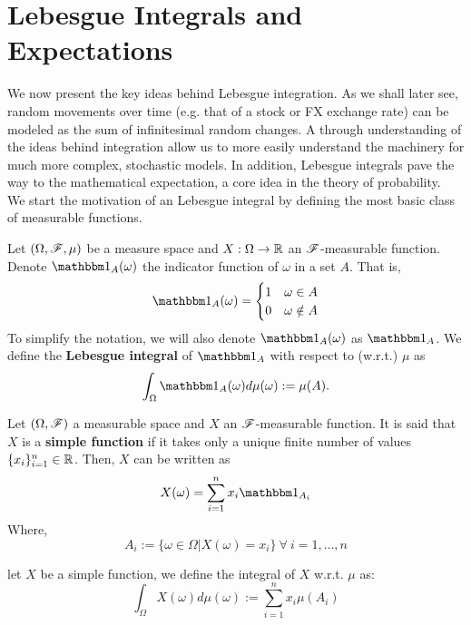 \documentclass[../TGMAFFIRO.tex]{subfiles}
\begin{document}
\section{Lebesgue Integrals and Expectations}
We now present the key ideas behind Lebesgue integration. As we shall later see, random movements over time (e.g. that of a stock or FX exchange rate) can be modeled as the sum of infinitesimal random changes. A through understanding of the ideas behind integration allow us to more easily understand the machinery for much more complex, stochastic models. In addition, Lebesgue integrals pave the way to the mathematical expectation, a core idea in the theory of probability.\\

We start the motivation of an Lebesgue integral by defining the most basic class of measurable functions.

\begin{definition}
	Let $(\Omega, \mathscr{F}, \mu)$ be a measure space and $X: \Omega \to \mathbb{R}$ an $\mathscr{F}$-measurable function. Denote $\ind_A(\omega)$ the indicator function of $\omega$ in a set $A$. That is,
	\[
	\ind_A(\omega) = 
		\begin{cases}
			1 & \omega \in A \\
			0 & \omega \notin A
		\end{cases}
	\]
	To simplify the notation, we will also denote $\ind_A(\omega)$ as $\ind_A$.
	We define the \textbf{Lebesgue integral} of $\ind_A$ with respect to (w.r.t.) $\mu$ as
	\begin{equation}
		\int_\Omega \ind_A(\omega) d\mu(\omega) := \mu(A).
	\end{equation}
	
\end{definition}

\begin{definition}
	Let $(\Omega, \mathscr{F})$ a measurable space and $X$ an $\mathscr{F}$-measurable function. It is said that $X$ is a \textbf{simple function} if it takes only a unique finite number of values $\{x_i\}_{i=1}^{n} \in \mathbb{R}$. Then, $X$ can be written as
	\begin{equation}
		X(\omega) = \sum_{i=1}^{n}x_i\ind_{A_i}
	\end{equation}
	Where,
	\[
		A_i := \{\omega \in \Omega | X(\omega) = x_i\} \ \forall \ i = 1, \ldots, n
	\]
\end{definition}

\begin{definition}
	let $X$ be a simple function, we define the integral of $X$ w.r.t. $\mu$ as:
	\begin{equation}
		\int_\Omega X(\omega) d\mu(\omega) := \sum_{i=1}^{n}x_i\mu(A_i)
	\end{equation}
\end{definition}
\end{document}
